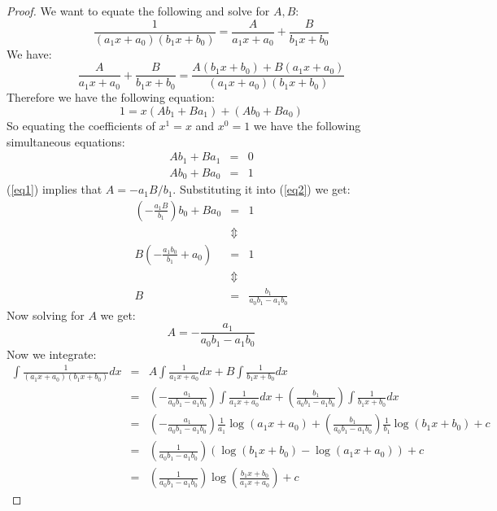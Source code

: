 \documentclass[11pt]{article}
\theoremstyle{definition}
\newcommand{\brac}[1]{\left(#1\right)}
\begin{document}
	\begin{proof}
		We want to equate the following and solve for $A,B$:
		$$\frac{1}{\brac{a_1 x+ a_0}\brac{b_1 x + b_0}} = \frac{A}{a_1 x + a_0}+\frac{B}{b_1 x + b_0}$$
		We have:
		$$\frac{A}{a_1 x + a_0}+\frac{B}{b_1 x + b_0} = \frac{A\brac{b_1 x + b_0} + B\brac{a_1 x + a_0}}{\brac{a_1 x + a_0}\brac{b_1 x + b_0}}$$
		Therefore we have the following equation:
		$$ 1 = x\brac{Ab_1 + Ba_1} + \brac{Ab_0 + B a_0}$$
		So equating the coefficients of $x^1=x$ and $x^0=1$ we have the following simultaneous equations:
		\begin{eqnarray}
			Ab_1 + Ba_1 &=& 0\label{eq1}\\
			Ab_0 + Ba_0 &=& 1\label{eq2}
		\end{eqnarray}
		(\ref{eq1}) implies that $A = -a_1 B/b_1$. Substituting it into (\ref{eq2}) we get:
		\begin{eqnarray*}
			\brac{-\frac{a_1 B}{b_1}}b_0 + Ba_0 &=& 1\\
			&\Updownarrow&\\
			B\brac{-\frac{a_1b_0}{b_1} + a_0} &=& 1\\
			&\Updownarrow&\\
			B &=& \frac{b_1}{a_0b_1 - a_1b_0}
		\end{eqnarray*}
		Now solving for $A$ we get:
		$$ A = -\frac{a_1}{a_0b_1-a_1b_0}$$
		Now we integrate:
		\begin{eqnarray*}
			\int \frac{1}{\brac{a_1 x+ a_0}\brac{b_1 x + b_0}}dx &=& A\int\frac{1}{a_1 x + a_0}dx+B\int\frac{1}{b_1 x + b_0}dx\\
			&=& \brac{-\frac{a_1}{a_0b_1-a_1b_0}}\int\frac{1}{a_1 x + a_0}dx + \brac{\frac{b_1}{a_0b_1 - a_1b_0}}\int\frac{1}{b_1 x + b_0}dx\\
			&=& \brac{-\frac{a_1}{a_0b_1-a_1b_0}}\frac{1}{a_1}\log\brac{a_1x + a_0} + \brac{\frac{b_1}{a_0b_1 - a_1b_0}}\frac{1}{b_1}\log\brac{b_1 x + b_0} + c\\
			&=&\brac{\frac{1}{a_0b_1-a_1b_0}}\brac{\log\brac{b_1 x + b_0} - \log\brac{a_1x + a_0}}+c\\
			&=&\brac{\frac{1}{a_0b_1-a_1b_0}}\log\brac{\frac{b_1 x + b_0}{a_1 x + a_0}}+c
		\end{eqnarray*} 
	\end{proof}
\end{document}
